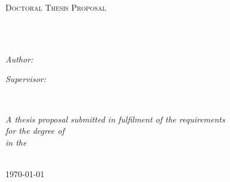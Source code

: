 \documentclass[
11pt, %
english, %
singlespacing, %
headsepline, %
]{MastersDoctoralThesis} %
\author{David \textsc{McDonald}}
\begin{document}
\frontmatter %

\pagestyle{plain} %


\begin{titlepage}
\begin{center}

\vspace*{.06\textheight}
{\scshape\LARGE \univname\par}\vspace{1.5cm} %
\textsc{\Large Doctoral Thesis Proposal}\\[0.5cm] %

\HRule \\[0.4cm] %
{\huge \bfseries \ttitle\par}\vspace{0.4cm} %
\HRule \\[1.5cm] %
 
\begin{minipage}[t]{0.4\textwidth}
\begin{flushleft} \large
\emph{Author:}\\
\href{dxm237@cs.bham.ac.uk}{\authorname} 
\end{flushleft}
\end{minipage}
\begin{minipage}[t]{0.4\textwidth}
\begin{flushright} \large
\emph{Supervisor:} \\
\href{s.he@cs.bham.ac.uk}{\supname} 
\end{flushright}
\end{minipage}\\[3cm]
 
\vfill

\large \textit{A thesis proposal submitted in fulfilment of the requirements\\ for the degree of \degreename}\\[0.3cm] %
\textit{in the}\\[0.4cm]
\deptname\\[2cm] %
 
\vfill

{\large \today}\\[4cm] %
 
\vfill
\end{center}
\end{titlepage}
\end{document}
